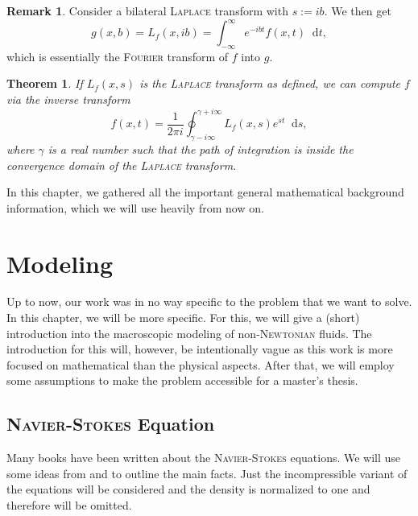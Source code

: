 \documentclass[12pt,a4paper,twoside, open=right]{scrreprt}
\theoremstyle{definition}
\newtheorem{rem}[auf]{Remark}
\theoremstyle{plain}
\newtheorem{sa}[auf]{Theorem}
\newcommand{\D}{\mathop{}\!\mathrm{d}}
\begin{document}
\begin{rem}
    Consider a bilateral \textsc{Laplace} transform with $s:=ib$. We then get
    \begin{equation}
        g(x,b)=L_f(x,ib)=\int_{-\infty}^\infty e^{-ibt}f(x,t)\D t,
    \end{equation}
    which is essentially the \textsc{Fourier} transform of $f$ into $g$.
\end{rem}
\begin{sa}
    If $L_f(x,s) $ is the \textsc{Laplace} transform as defined, we can compute $f$ via the inverse transform
    \begin{equation}
        f(x,t) = \frac{1}{2\pi i}\oint_{\gamma-i\infty}^{\gamma +i\infty}L_f(x,s)e^{st}\D s,
    \end{equation}
    where $\gamma$ is a real number such that the path of integration is inside the convergence domain of the \textsc{Laplace} transform.
\end{sa}
In this chapter, we gathered all the important general mathematical background information, which we will use heavily from now on. 
\chapter{Modeling}
\label{ch:model}
Up to now, our work was in no way specific to the problem that we want to solve. In this chapter, we will be more specific. For this, we will give a (short) introduction into the macroscopic modeling of  non-\textsc{Newtonian} fluids. The introduction for this will, however, be intentionally vague as this work is more focused on mathematical than the physical aspects. After that, we will employ some assumptions to make the problem accessible for a master's thesis.
\section{\textsc{Navier-Stokes} Equation}
Many books have been written about the \textsc{Navier-Stokes} equations. We will use some ideas from \cite{Lukaszewicz2016} and \cite{White2006} to outline the main facts. Just the incompressible variant of the equations will be considered and the density is normalized to one and therefore will be omitted.
\end{document}
